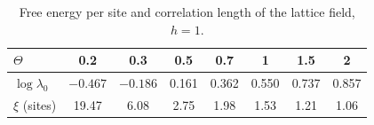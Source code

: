 \begin{table}[h]
\centering\small
\caption{Free energy per site and correlation length of the lattice field, $h=1$.}
\label{tab:logz}
\begin{tabular}{lccccccc}
\toprule
$\Theta$ & 0.2 & 0.3 & 0.5 & 0.7 & 1 & 1.5 & 2 \\
\midrule
$\log\lambda_0$ & $-0.467$ & $-0.186$ & 0.161 & 0.362 & 0.550 & 0.737 & 0.857 \\
$\xi$ (sites) & 19.47 & 6.08 & 2.75 & 1.98 & 1.53 & 1.21 & 1.06 \\
\bottomrule
\end{tabular}
\end{table}
